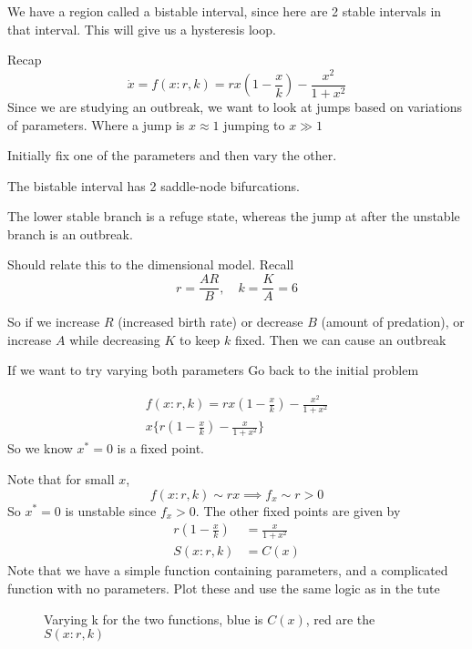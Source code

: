 \documentclass{X:/Documents/Coding/Latex/myassignment}
\begin{document}
We have a region called a bistable interval, since here are 2 stable intervals in that interval. This will give us a hysteresis loop.




Recap
\[\dot x = f(x:r,k) = rx\left(1-\frac xk\right) - \frac{x^2}{1+x^2}\]
Since we are studying an outbreak, we want to look at jumps based on variations of parameters. Where a jump is $x\approx 1$ jumping to $x\gg 1$

Initially fix one of the parameters and then vary the other.

The bistable interval has 2 saddle-node bifurcations.


The lower stable branch is a refuge state, whereas the jump at after the unstable branch is an outbreak.

Should relate this to the dimensional model. Recall
\[r = \frac{AR}{B},\quad k=\frac KA = 6\]


So if we increase $R$ (increased birth rate) or decrease $B$ (amount of predation), or increase $A$ while decreasing $K$ to keep $k$ fixed. Then we can cause an outbreak


If we want to try varying both parameters
Go back to the initial problem

\begin{align*}
    f(x:r,k) = rx\left(1-\frac xk\right) - \frac{x^2}{1+x^2}\\
    x\{r\left(1-\frac xk\right) - \frac{x}{1+x^2}\}
\end{align*}
So we know $x^* =0 $ is a fixed point. 

Note that for small $x$,
\[f(x:r,k) \sim rx \implies f_x \sim r > 0\]
So $x^* = 0$ is unstable since $f_x > 0$.
The other fixed points are given by
\begin{align*}
    r\left(1-\frac xk\right) &= \frac{x}{1+x^2} \\
    S(x:r,k) &= C(x)
\end{align*}
Note that we have a simple function containing parameters, and a complicated function with no parameters. Plot these and use the same logic as in the tute


\begin{figure}[h]
\centering
{}
\caption{Varying k for the two functions, blue is $C(x)$, red are the $S(x:r,k)$}
\end{figure}
\end{document}
